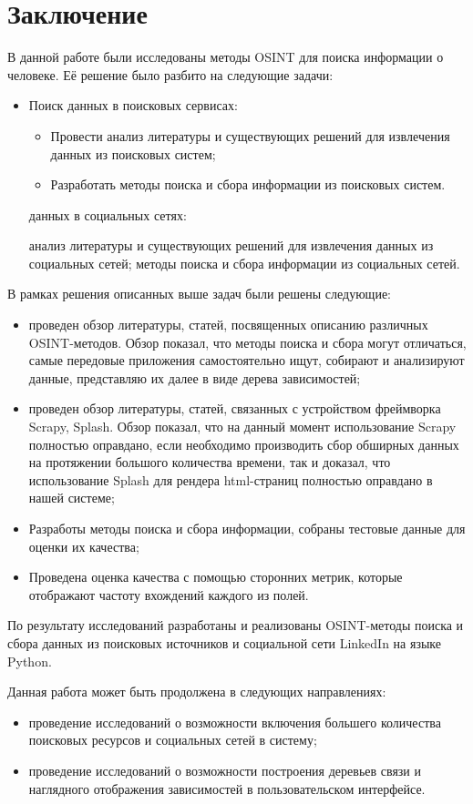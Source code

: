 \section{Заключение}
\label{sec:Chapter5} 
В данной работе были исследованы методы OSINT для поиска информации о человеке. Её решение было разбито на следующие задачи:
\begin{itemize}
    \item Поиск данных в поисковых сервисах:
    \begin{itemize}
        \item Провести анализ литературы и существующих решений для извлечения данных из поисковых систем;
        \item Разработать методы поиска и сбора информации из поисковых систем.
    \end{itemize}
     данных в социальных сетях:
    \begin{itemize}
         анализ литературы и существующих решений для извлечения данных из социальных сетей;
         методы поиска и сбора информации из социальных сетей.
    \end{itemize}
\end{itemize}

В рамках решения описанных выше задач были решены следующие:
\begin{itemize}
    \item проведен обзор литературы, статей, посвященных описанию различных OSINT-методов. Обзор показал, что методы поиска и 
    сбора могут отличаться, самые передовые приложения самостоятельно ищут, собирают и анализируют данные, представляю их 
    далее в виде дерева зависимостей;
    \item проведен обзор литературы, статей, связанных с устройством фреймворка Scrapy, Splash. Обзор показал, что на данный 
    момент использование Scrapy полностью оправдано, если необходимо производить сбор обширных данных на протяжении большого 
    количества времени, так и доказал, что использование Splash для рендера html-страниц полностью оправдано в нашей системе;
    \item Разработы методы поиска и сбора информации, собраны тестовые данные для оценки их качества;
    \item Проведена оценка качества с помощью сторонних метрик, которые отображают частоту вхождений каждого из полей.
\end{itemize}

По результату исследований разработаны и реализованы OSINT-методы поиска и сбора данных из поисковых источников и социальной сети
LinkedIn на языке Python.
\par
Данная работа может быть продолжена в следующих направлениях:
\begin{itemize}
    \item проведение исследований о возможности включения большего количества поисковых ресурсов и социальных сетей в систему;
    \item проведение исследований о возможности построения деревьев связи и наглядного отображения зависимостей в пользовательском
    интерфейсе.
\end{itemize}

